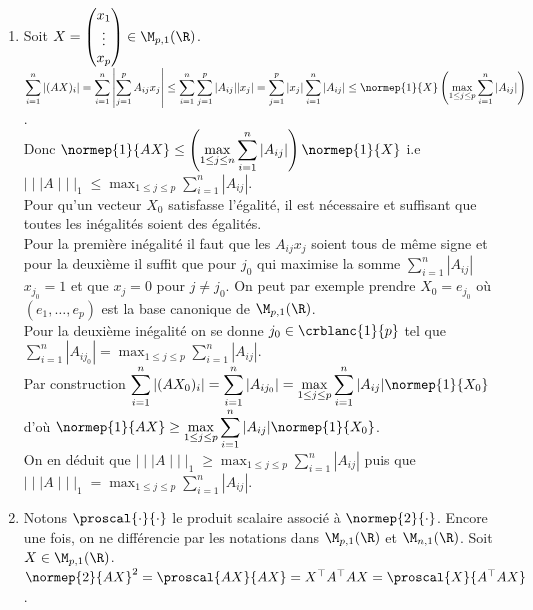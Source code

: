 \documentclass{book}
\begin{document}
\begin{enumerate}
		On en déduit que $\mid\mid\mid A\mid\mid\mid_\infty\geq \displaystyle\max_{1\leq i\leq n}\sum_{j=1}^p|A_{ij}|$ puis que $\mid\mid\mid A\mid\mid\mid_\infty=\displaystyle\max_{1\leq i\leq n}\sum_{j=1}^p|A_{ij}|$.
		\item Soit $X=\begin{pmatrix}x_1\\\vdots\\x_p\end{pmatrix}\in \M_{p,1}(\R)$.\\
		$\displaystyle\sum_{i=1}^n|(AX)_i|=\sum_{i=1}^n\left|\sum_{j=1}^pA_{ij}x_j\right|\leq \sum_{i=1}^n\sum_{j=1}^p|A_{ij}||x_j|=\sum_{j=1}^p|x_j|\sum_{i=1}^n|A_{ij}|\leq \normep{1}{X}\left(\max_{1\leq j\leq p}\sum_{i=1}^n|A_{ij}|\right)$.\\
		Donc $\normep{1}{AX}\leq \displaystyle\left(\max_{1\leq j\leq n}\sum_{i=1}^n|A_{ij}|\right)\normep{1}{X}$ i.e $\mid\mid\mid A\mid\mid\mid_1\leq \displaystyle\max_{1\leq j\leq p}\sum_{i=1}^n|A_{ij}|$.\\
		Pour qu'un vecteur $X_0$ satisfasse l'égalité, il est nécessaire et suffisant que toutes les inégalités soient des égalités.\\
		Pour la première inégalité il faut que les $A_{ij}x_j$ soient tous de même signe et pour la deuxième il suffit que pour $j_0$ qui maximise la somme $\displaystyle\sum_{i=1}^n|A_{ij}|$ $x_{j_0}=1$ et que $x_j=0$ pour $j\ne j_0$. On peut par exemple prendre $X_0=e_{j_0}$ où $(e_1,\dots,e_p)$ est la base canonique de $\M_{p,1}(\R)$.\\
		Pour la deuxième inégalité on se donne $j_0\in \crblanc{1}{p}$ tel que $\displaystyle\sum_{i=1}^n|A_{ij_0}|=\max_{1\leq j\leq p}\sum_{i=1}^n|A_{ij}|$.\\
		Par construction $\displaystyle\sum_{i=1}^n|(AX_0)_i|=\sum_{i=1}^n|A_{ij_0}|=\max_{1\leq j\leq p}\sum_{i=1}^n|A_{ij}|\normep{1}{X_0}$ d'où $\normep{1}{AX}\geq \displaystyle\max_{1\leq j\leq p}\sum_{i=1}^n|A_{ij}|\normep{1}{X_0}$.\\
		On en déduit que $\mid\mid\mid A\mid\mid\mid_1\geq \displaystyle\max_{1\leq j\leq p}\sum_{i=1}^n|A_{ij}|$ puis que $\mid\mid\mid A\mid\mid\mid_1=\displaystyle\max_{1\leq j\leq p}\sum_{i=1}^n|A_{ij}|$.
		\item Notons $\proscal{\cdot}{\cdot}$ le produit scalaire associé à $\normep{2}{\cdot}$. Encore une fois, on ne différencie par les notations dans $\M_{p,1}(\R)$ et $\M_{n,1}(\R)$. Soit $X\in \M_{p,1}(\R)$.\\
		$\normep{2}{AX}^2=\proscal{AX}{AX}=X^\top A^\top AX=\proscal{X}{A^\top AX}$.\\

\end{enumerate}
\end{document}
